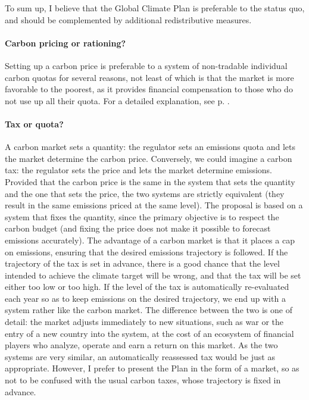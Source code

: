 \documentclass[a5paper,english,openany]{memoir}
\begin{document}
To sum up, I believe that the Global Climate Plan is preferable to the status quo, and should be complemented by additional redistributive measures.

\paragraph{Carbon pricing or rationing?} %
Setting up a carbon price %
is preferable to a system of non-tradable individual carbon quotas for several reasons, %
 not least of which is that the market is more favorable %
 to the poorest, as it provides financial compensation to those who do not use up all their quota. For a detailed explanation, %
 see p. \pageref{q:rationing}.


\paragraph{Tax or quota?}
A carbon market sets a quantity: the regulator sets an emissions quota and lets the market determine the carbon price. Conversely, we could imagine a carbon tax: the regulator sets the price and lets the market determine emissions. Provided that the carbon price is the same in the system that sets the quantity and the one that sets the price, the two systems are strictly equivalent (they result in the same emissions priced at the same level). The %
proposal is based on a system that fixes the quantity, since the primary objective is to respect the carbon budget (and fixing the price does not make it possible to forecast emissions accurately).
The advantage of a carbon market is that it places a cap on emissions, ensuring that the desired emissions trajectory is followed. If the trajectory of the tax is set in advance, there is %
a good chance that the level intended %
to achieve the climate target will be wrong, and that the tax will be set either too low or too high. If the level of the tax is automatically re-evaluated
each year so as to keep emissions on the desired trajectory, we end up with a system rather like the carbon market. The difference between the two is one of detail: the market adjusts immediately to new situations, such as war or the entry of a new country into the system, %
at the cost of an ecosystem of financial players who analyze, %
operate and earn a return on this market. As the two systems are very similar, an automatically reassessed tax would be just as appropriate. However, I prefer to present the Plan in the form of a market, so as not to be confused with the usual carbon taxes, whose trajectory is fixed in advance. 
\end{document}

